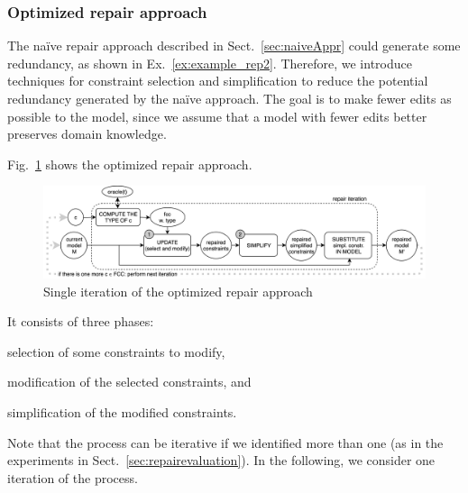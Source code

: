 \begin{tikzborder}{\cite{Gargantini16:validation}}
\begin{tikzborder}{\cite{gargantini_combinatorial_2017}}
\begin{tikzborder}{\cite{gargantini_combinatorial_2017}}
\begin{tikzborder}{\cite{garn2019}}
\begin{tikzborder}{\cite{arcaini2019achieving}}
\begin{tikzborder}{\cite{arcaini2019varivolution}}
		\subsubsection{Optimized repair approach}\label{sec:optimizedApproach}
		
		\bb The na{\"i}ve repair approach described in Sect.~\ref{sec:naiveAppr} could generate some redundancy, as shown in Ex.~\ref{ex:example_rep2}. Therefore, we introduce techniques for constraint selection and simplification to reduce the potential redundancy generated by the na{\"i}ve approach. The goal is to make fewer edits as possible to the model, since we assume that a model with fewer edits better preserves domain knowledge.
		
		Fig.~\ref{fig:repair_process} shows the optimized repair approach.\be
		\begin{figure}[!ht]
			\centering
			\includegraphics[width=1\textwidth]{images/repair_process_new.png}
			\caption{Single iteration of the optimized repair approach}
			\label{fig:repair_process}
		\end{figure}
		
		\bb It consists of three phases:
		\begin{inparaenum}[(1)]
			\item \textsf{selection} of some constraints to modify,
			\item \textsf{modification} of the selected constraints, and
			\item \textsf{simplification} of the modified constraints.
		\end{inparaenum}
		Note that the process can be iterative if we identified more than one \fcc (as in the experiments in Sect.~\ref{sec:repairevaluation}). In the following, we consider one iteration of the process.\be
		

\end{tikzborder}
\end{tikzborder}
\end{tikzborder}
\end{tikzborder}
\end{tikzborder}
\end{tikzborder}
